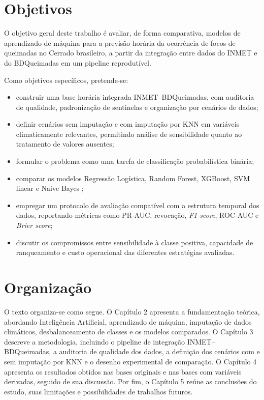 \section{Objetivos}

O objetivo geral deste trabalho é avaliar, de forma comparativa, modelos de aprendizado de máquina para a previsão horária da ocorrência de focos de queimadas no Cerrado brasileiro, a partir da integração entre dados do INMET e do BDQueimadas em um pipeline reprodutível.

Como objetivos específicos, pretende-se:
\begin{itemize}
    \item construir uma base horária integrada INMET--BDQueimadas, com auditoria de qualidade, padronização de sentinelas e organização por cenários de dados;
    \item definir cenários sem imputação e com imputação por KNN em variáveis climaticamente relevantes, permitindo análise de sensibilidade quanto ao tratamento de valores ausentes;
    \item formular o problema como uma tarefa de classificação probabilística binária;
    \item comparar os modelos Regressão Logística, Random Forest, XGBoost, SVM linear e Naive Bayes \cite{breiman2001randomForest,chen2016xgboost};
    \item empregar um protocolo de avaliação compatível com a estrutura temporal dos dados, reportando métricas como PR-AUC, revocação, \textit{F1-score}, ROC-AUC e \textit{Brier score};
    \item discutir os compromissos entre sensibilidade à classe positiva, capacidade de ranqueamento e custo operacional das diferentes estratégias avaliadas.
\end{itemize}

\section{Organização}

O texto organiza-se como segue. O Capítulo 2 apresenta a fundamentação teórica, abordando Inteligência Artificial, aprendizado de máquina, imputação de dados climáticos, desbalanceamento de classes e os modelos comparados. O Capítulo 3 descreve a metodologia, incluindo o pipeline de integração INMET--BDQueimadas, a auditoria de qualidade dos dados, a definição dos cenários com e sem imputação por KNN e o desenho experimental de comparação. O Capítulo 4 apresenta os resultados obtidos nas bases originais e nas bases com variáveis derivadas, seguido de sua discussão. Por fim, o Capítulo 5 reúne as conclusões do estudo, suas limitações e possibilidades de trabalhos futuros.
